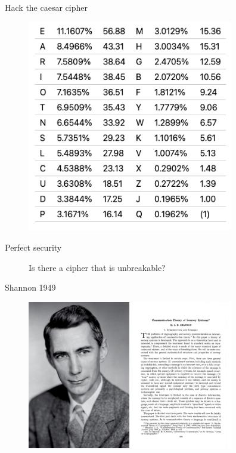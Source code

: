 \documentclass[10pt,pdf,hyperref={unicode}]{beamer}
\begin{document}
\begin{frame}{Hack the caesar cipher}
 \begin{figure} 
   \includegraphics[width=90mm,scale=0.5]{english_letters}
  \end{figure}
\end{frame}

\begin{frame}{Perfect security}
 \begin{figure} 
   Is there a cipher that is unbreakable?
 \end{figure}
\end{frame}

\begin{frame}{Shannon 1949}
 \begin{figure} 
   \includegraphics[width=90mm,scale=0.5]{shannon.png}
 \end{figure}
\end{frame}
\end{document}
